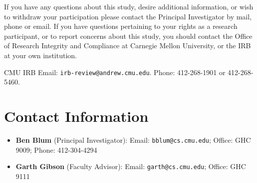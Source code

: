 \documentclass{article}
\begin{document}
\noindent If you have any questions about this study, desire additional information, or wish to withdraw
your participation please contact the Principal Investigator by mail, phone or email.
If you have questions pertaining to your rights as a research participant,
or to report concerns about this study, you should contact the
Office of Research Integrity and Compliance at Carnegie Mellon University,
or the IRB at your own institution.

CMU IRB Email: {\tt irb-review@andrew.cmu.edu}. Phone: 412-268-1901 or 412-268-5460.


\section{Contact Information}

\begin{itemize}
	\item {\bf Ben Blum} (Principal Investigator): Email: {\tt bblum@cs.cmu.edu}; Office: GHC 9009; Phone: 412-304-4294
	\item {\bf Garth Gibson} (Faculty Advisor): Email: {\tt garth@cs.cmu.edu}; Office: GHC 9111
\end{itemize}
\end{document}
